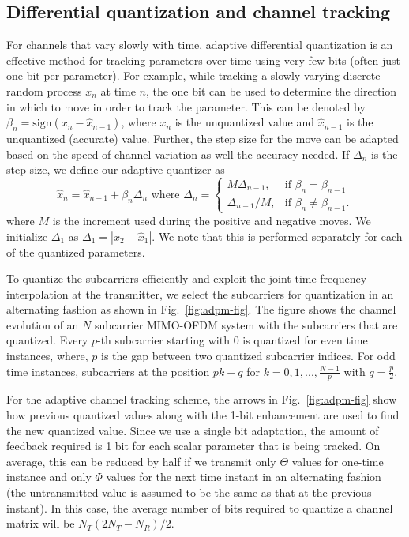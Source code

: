 \documentclass[journal,10pt,twocolumn]{IEEEtran}
\begin{document}
\subsection{Differential quantization and channel tracking}
\label{quantiz}
For channels that vary slowly with time, adaptive differential
quantization is an effective method for tracking parameters over time
using very few bits (often just one bit per parameter). For example,
while tracking a slowly varying discrete random process $x_n$ at time
$n$, the one bit can be used to determine the direction in which to
move in order to track the parameter. This can be denoted by
$\beta_{n} = \mbox{sign}(x_{n} - \hat{x}_{n-1})$, where $x_n$ is the
unquantized value and $\hat{x}_{n-1}$ is the unquantized (accurate)
value. Further, the step size for the move can be adapted based on the
speed of channel variation as well the accuracy needed. If $\Delta_n$
is the step size, we define our adaptive quantizer as
\begin{equation}
\hat{x}_{n} = \hat{x}_{n-1} + \beta_{n}\Delta_{n} \mbox{ where }
\label{delta_eqn}
\Delta_{n} = \begin{cases}
    M \Delta_{n-1}, & \text{if $\beta_{n} = \beta_{n-1}$}\\
    \Delta_{n-1}/M , & \text{if $\beta_{n} \neq \beta_{n-1}$}.
  \end{cases}
\end{equation}
where $M$ is the increment used during the positive and negative
moves. We initialize $\Delta_1$ as $\Delta_1 = |x_{2}-\hat{x}_1|$. We
note that this is performed separately for each of the quantized
parameters.

To quantize the subcarriers efficiently and exploit the joint
time-frequency interpolation at the transmitter, we select the
subcarriers for quantization in an alternating fashion as shown in
Fig.~\ref{fig:adpm-fig}. The figure shows the channel evolution of an
$N$ subcarrier MIMO-OFDM system with the subcarriers that are
quantized. Every $p$-th subcarrier starting with $0$ is quantized for
even time instances, where, $p$ is the gap between two quantized
subcarrier indices. For odd time instances, subcarriers at the
position $pk+q$ for $k = 0,1,..., \frac{N-1}{p}$ with $q =
{\frac{p}{2}}$.

For the adaptive channel tracking scheme, the arrows in
Fig.~\ref{fig:adpm-fig} show how previous quantized values along with
the 1-bit enhancement are used to find the new quantized value. Since
we use a single bit adaptation, the amount of feedback required is 1
bit for each scalar parameter that is being tracked. On average, this
can be reduced by half if we transmit only $\Theta$ values for
one-time instance and only $\Phi$ values for the next time instant in
an alternating fashion (the untransmitted value is assumed to be the
same as that at the previous instant). In this case, the average
number of bits required to quantize a channel matrix will be
$N_{T}(2N_{T} - N_{R})/2$.
\end{document}
